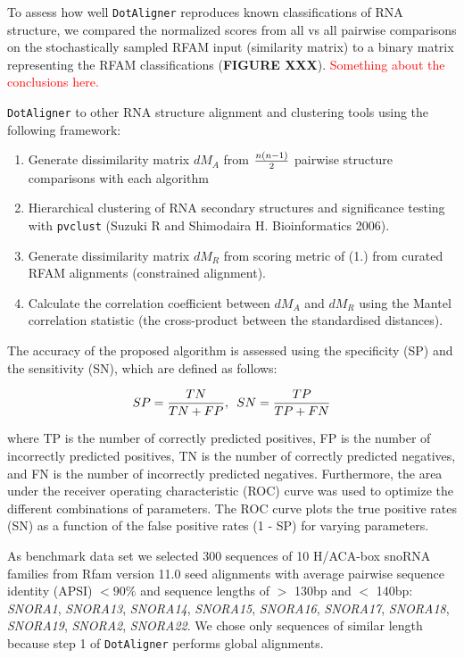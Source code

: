 \documentclass[a4paper,twoside]{article}
\newcommand\dotaligner{\texttt{DotAligner}}
\newcommand\pvclust{\texttt{pvclust}}
\newcommand{\RED}[1]{\textcolor{red}{#1}}
\newcommand{\GRAY}[1]{\textcolor{mygray}{#1}}
\begin{document}
To assess how well \dotaligner{} reproduces known classifications of RNA structure, 
we compared the normalized scores from all vs all pairwise comparisons on the 
stochastically sampled RFAM input (similarity matrix) to a binary matrix representing
the RFAM classifications (\textbf{FIGURE XXX}). 
\RED{Something about the conclusions here. }


\texttt{DotAligner} to other RNA structure alignment and clustering tools using
the following framework: 

\begin{enumerate}
\item Generate dissimilarity matrix $dM_A$ from ${n(n-1)}\over{2}$ pairwise structure comparisons with each algorithm
\item Hierarchical clustering of RNA secondary structures and significance testing with \pvclust{} (Suzuki R and Shimodaira H. Bioinformatics 2006).
\item Generate dissimilarity matrix $dM_R$ from scoring metric of (1.) from curated RFAM alignments (constrained alignment). 
\item Calculate the correlation coefficient between $dM_A$ and $dM_R$ using the Mantel correlation statistic (the cross-product between the standardised distances). 
\end{enumerate}

\noindent The accuracy of the proposed algorithm is assessed using the
specificity (SP) and the sensitivity (SN), which are defined as follows:

\begin{equation}\label{eq13}
	SP = \frac{TN}{TN + FP}, \hspace{5px} SN = \frac{TP}{TP + FN}
\end{equation}

where TP is the number of correctly predicted positives, FP is the number of
incorrectly predicted positives, TN is the number of correctly predicted
negatives, and FN is the number of incorrectly predicted negatives.
Furthermore, the area under the receiver operating characteristic (ROC) curve
was used to optimize the different combinations of parameters. The ROC curve
plots the true positive rates (SN) as a function of the false positive rates (1
- SP) for varying parameters.

\GRAY{As benchmark data set we selected 300 sequences of 10 H/ACA-box snoRNA families
from Rfam version 11.0 seed alignments with average pairwise sequence identity
(APSI) $< 90\%$ and sequence lengths of $>$ 130bp and $<$ 140bp: \emph{SNORA1},
\emph{SNORA13}, \emph{SNORA14}, \emph{SNORA15}, \emph{SNORA16}, \emph{SNORA17},
\emph{SNORA18}, \emph{SNORA19}, \emph{SNORA2}, \emph{SNORA22}. We chose only
sequences of similar length because step 1 of \dotaligner{} performs global
alignments.}
\end{document}
